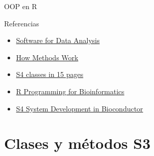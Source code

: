 \documentclass[xcolor={usenames,svgnames,dvipsnames}]{beamer}
\begin{document}
\begin{frame}[label={sec:orgheadline2}]{OOP en R}
\begin{block}{Referencias}
\begin{center}
\begin{itemize}
\item \href{http://www.springer.com/gb/book/9780387759357}{Software for Data Analysis}
\item \href{http://developer.r-project.org/howMethodsWork.pdf}{How Methods Work}
\item \href{http://www.stat.auckland.ac.nz/S-Workshop/Gentleman/S4Objects.pdf}{S4 classes in 15 pages}
\item \href{http://bioconductor.org/help/publications/books/r-programming-for-bioinformatics/}{R Programming for Bioinformatics }
\item \href{http://bioconductor.org/help/course-materials/2010/AdvancedR/S4InBioconductor.pdf}{S4 System Development in Bioconductor}
\end{itemize}
\end{center}
\end{block}
\end{frame}

\section{Clases y métodos S3}
\label{sec:orgheadline20}
\end{document}
